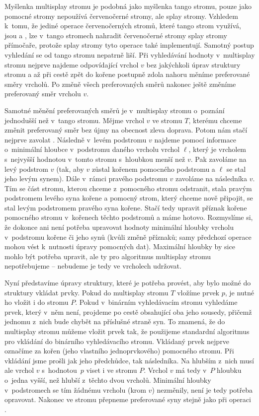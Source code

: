 Myšlenka multisplay stromu je podobná jako myšlenka tango stromu, pouze jako
pomocné stromy nepoužívá červenočerné stromy, ale splay stromy. Vzhledem
k~tomu, že jediné operace červenočerných stromů, které tango strom využívá, jsou
 a , lze v~tango stromech nahradit červenočerné stromy
splay stromy přímočaře, protože splay stromy tyto operace také implementují.
Samotný postup vyhledání se od tango stromu nepatrně liší. Při vyhledávání
hodnoty v~multisplay stromu nejprve najdeme odpovídající vrchol $v$ bez
jakýchkoli úprav struktury stromu a až při cestě zpět do kořene postupně
zdola nahoru měníme preferované směry vrcholů. Po změně všech preferovaných
směrů nakonec ještě změníme preferovaný směr vrcholu $v$.

Samotné měnění preferovaných směrů je v~multisplay stromu o~poznání jednodušší než v~tango stromu.
Mějme vrchol $v$ ve stromu $T$, kterému chceme změnit preferovaný směr bez újmy
na obecnost zleva doprava. Potom nám stačí nejprve zavolat .
Následně v~levém podstromu $v$ najdeme pomocí informace o~minimální hloubce
v~podstromu daného vrcholu vrchol $\ell$, který je vrcholem s~nejvyšší hodnotou
v~tomto stromu s~hloubkou menší než $v$. Pak zavoláme  na levý
podstrom $v$ (tak, aby $v$ zůstal kořenem pomocného podstromu a $\ell$ se
stal jeho levým synem). Dále v~rámci pravého podstromu $v$ zavoláme 
na následníka $v$. Tím se část stromu, kterou chceme z~pomocného stromu
odstranit, stala pravým podstromem levého syna kořene a pomocný strom, který
chceme nově připojit, se stal levým podstromem pravého syna kořene. Stačí tedy
upravit příznak kořene pomocného stromu v~kořenech těchto podstromů a máme
hotovo. Rozmyslíme si, že dokonce ani není potřeba upravovat hodnoty minimální
hloubky vrcholu v~podstromu kořene či jeho synů (kvůli změně příznaků; samy
předchozí operace  mohou vést k~nutnosti úpravy pomocných dat).
Maximální hloubky by sice mohlo být potřeba upravit, ale ty pro algoritmus
multisplay stromu nepotřebujeme -- nebudeme je tedy ve vrcholech
udržovat.

Nyní představíme úpravy struktury, které je potřeba provést, aby bylo možné do
struktury vkládat prvky.  Pokud do multisplay stromu $T$ vložíme prvek $p$, je
nutné ho vložit i do stromu $P$. Pokud v~binárním vyhledávacím stromu vyhledáme
prvek, který v~něm není, projdeme po cestě obsahující oba jeho sousedy, přičemž
jednomu z~nich bude chybět na příslušné straně syn. To znamená, že do
multisplay stromu můžeme vložit prvek tak, že použijeme standardní algoritmus
pro vkládání do binárního vyhledávacího stromu. Vkládaný prvek nejprve označíme
za kořen (jeho vlastního jednoprvkového) pomocného stromu. Při vkládání jsme prošli
jak jeho předchůdce, tak následníka. Na hlubším z~nich musí ale vrchol $v$
s~hodnotou~$p$ viset i ve stromu $P$. Vrchol $v$ má tedy v~$P$ hloubku o~jedna vyšší,
než hlubší z~těchto dvou vrcholů. Minimální hloubky v~podstromech se tím
žádnému vrcholu (krom $v$) nezměnily, není je tedy potřeba opravovat. Nakonec
ve stromu přepneme preferované syny stejně jako při operaci .

